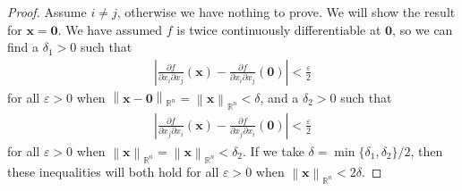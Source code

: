\documentclass{article}
\newcommand{\R}{\mathbb{R}}
\newcommand{\x}{\mathbf{x}}
\newcommand{\ze}{\mathbf{0}}
\newcommand{\norm}[1]{\left\lVert#1\right\rVert}
\newcommand{\abs}[1]{\left\lvert#1\right\rvert}
\theoremstyle{definition}
\begin{document}
\begin{proof}
	Assume $ i\neq j $, otherwise we have nothing to prove. We will show the result for $ \x = \ze $. We have assumed $ f $ is twice continuously differentiable at $ \ze $, so we can find a $ \delta_1 > 0 $ such that 
	\begin{align}
		\abs{\frac{\partial f}{\partial x_i\partial x_j}(\x) - \frac{\partial f}{\partial x_i\partial x_j}(\ze)}<\frac{ \varepsilon}{2}
	\end{align}
for all $ \varepsilon >0 $ when $ \norm{\x - \ze}_{\R^n} = \norm{\x}_{\R^n} <\delta $, and a $ \delta_2 > 0 $ such that 
\begin{align}
	\abs{\frac{\partial f}{\partial x_j\partial x_i}(\x) - \frac{\partial f}{\partial x_j\partial x_i}(\ze)}< \frac{ \varepsilon}{2}
\end{align}
for all $ \varepsilon >0$  when $ \norm{\x}_{\R^n} = \norm{\x}_{\R^n}<\delta _2 $. If we take $ \delta = \min\{\delta_1,\delta_2\}/2 $, then these inequalities will both hold for all $ \varepsilon >0$  when $ \norm{\x}_{\R^n} < 2\delta $. 


\end{proof}
\end{document}
